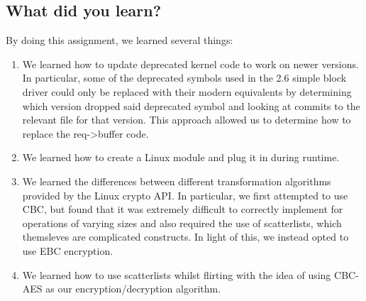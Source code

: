 \documentclass[letterpaper,10pt,titlepage,draftclsnofoot,onecolumn]{article}
\begin{document}
\subsection{What did you learn?}
By doing this assignment, we learned several things:
\begin{enumerate}
\item We learned how to update deprecated kernel code to work on newer versions. In particular, some of the deprecated symbols used in the 2.6 simple block driver could only be replaced with their modern equivalents by determining which version dropped said deprecated symbol and looking at commits to the relevant file for that version. This approach allowed us to determine how to replace the req->buffer code.
\item We learned how to create a Linux module and plug it in during runtime.
\item We learned the differences between different transformation algorithms provided by the Linux crypto API. In particular, we first attempted to use CBC, but found that it was extremely difficult to correctly implement for operations of varying sizes and also required the use of scatterlists, which themsleves are complicated constructs. In light of this, we instead opted to use EBC encryption.
\item We learned how to use scatterlists whilst flirting with the idea of using CBC-AES as our encryption/decryption algorithm.
\end{enumerate}
\end{document}
